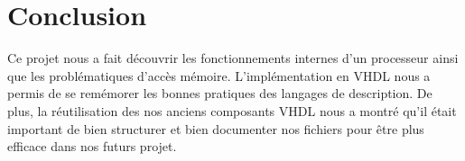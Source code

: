 \documentclass{article}
\begin{document}
    \section{Conclusion}
    \par Ce projet nous a fait découvrir les fonctionnements internes d'un processeur ainsi que les problématiques d'accès mémoire. L'implémentation en VHDL nous a permis de se remémorer les bonnes pratiques des langages de description. De plus, la réutilisation des nos anciens composants VHDL nous a montré qu'il était important de bien structurer et bien documenter nos fichiers pour être plus efficace dans nos futurs projet.

\end{document}
